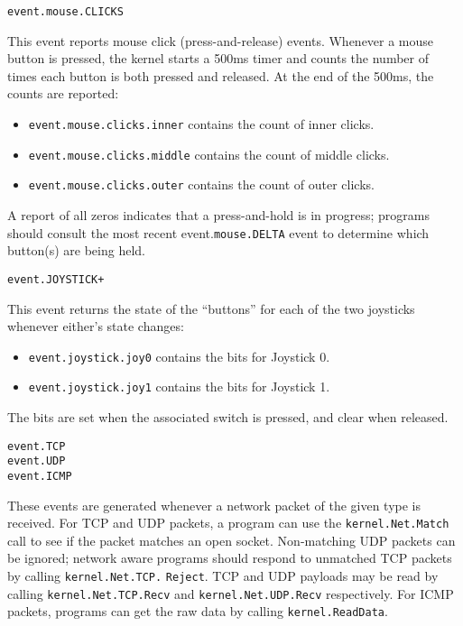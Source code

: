 \begin{verbatim}
event.mouse.CLICKS
\end{verbatim}

This event reports mouse click (press-and-release) events.  Whenever a mouse button is pressed, the kernel starts a 500ms timer and counts the number of times each button is both pressed and released.  At the end of the 500ms, the counts are reported:

\begin{itemize}
\item \verb+event.mouse.clicks.inner+ contains the count of inner clicks.
\item \verb+event.mouse.clicks.middle+ contains the count of middle clicks.
\item \verb+event.mouse.clicks.outer+ contains the count of outer clicks.
\end{itemize}

A report of all zeros indicates that a press-and-hold is in progress; programs should consult the most recent event.\verb+mouse.DELTA+ event to determine which button(s) are being held. 

\begin{verbatim}
event.JOYSTICK+
\end{verbatim}

This event returns the state of the ``buttons'' for each of the two joysticks whenever either's state changes:

\begin{itemize}
\item \verb+event.joystick.joy0+ contains the bits for Joystick 0.
\item \verb+event.joystick.joy1+ contains the bits for Joystick 1.
\end{itemize}

The bits are set when the associated switch is pressed, and clear when released.

\begin{verbatim}
event.TCP
event.UDP
event.ICMP
\end{verbatim}

These events are generated whenever a network packet of the given type is received.  For TCP and UDP packets, a program can use the \verb+kernel.Net.Match+ call to see if the packet matches an open socket.  Non-matching UDP packets can be ignored; network aware programs should respond to unmatched TCP packets by calling \verb+kernel.Net.TCP.+ \verb+Reject+. TCP and UDP payloads may be read by calling \verb+kernel.Net.TCP.Recv+ and \verb+kernel.Net.UDP.Recv+ respectively.  For ICMP packets, programs can get the raw data by calling \verb+kernel.ReadData+.   


